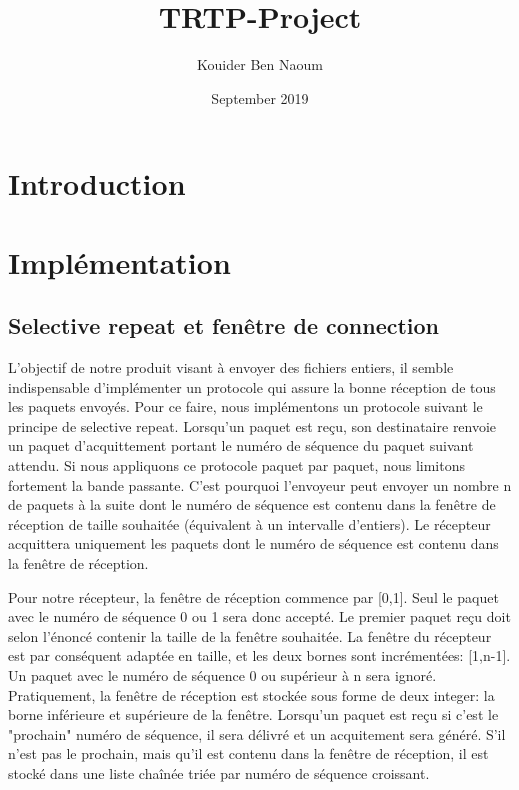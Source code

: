 \documentclass{article}
\title{TRTP-Project}
\author{Kouider Ben Naoum}
\date{September 2019}
\begin{document}
\maketitle




\section{Introduction}
\section{Implémentation}
\subsection{Selective repeat et fenêtre de connection}
L'objectif de notre produit visant à envoyer des fichiers entiers, il semble indispensable d'implémenter un protocole qui assure la bonne réception de tous les paquets envoyés. Pour ce faire, nous implémentons un protocole suivant le principe de selective repeat. Lorsqu'un paquet est reçu, son destinataire renvoie un paquet d'acquittement portant le numéro de séquence du paquet suivant attendu. Si nous appliquons ce protocole paquet par paquet, nous limitons fortement la bande passante. C'est pourquoi l'envoyeur peut envoyer un nombre n de paquets à la suite dont le numéro de séquence est contenu dans la fenêtre de réception de taille souhaitée (équivalent à un intervalle d'entiers). Le récepteur acquittera uniquement les paquets dont le numéro de séquence est contenu dans la fenêtre de réception.

Pour notre récepteur, la fenêtre de réception commence par [0,1]. Seul le paquet avec le numéro de séquence 0 ou 1 sera donc accepté. Le premier paquet reçu doit selon l'énoncé contenir la taille de la fenêtre souhaitée. La fenêtre du récepteur est par conséquent adaptée en taille, et les deux bornes sont incrémentées: [1,n-1]. Un paquet avec le numéro de séquence 0 ou supérieur à n sera ignoré. Pratiquement, la fenêtre de réception est stockée sous forme de deux integer: la borne inférieure et supérieure de la fenêtre.
Lorsqu'un paquet est reçu si c'est le "prochain" numéro de séquence, il sera délivré et un acquitement sera généré. S'il n'est pas le prochain, mais qu'il est contenu dans la fenêtre de réception, il est stocké dans une liste chaînée triée par numéro de séquence croissant.
\end{document}

